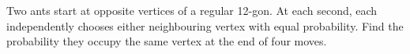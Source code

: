 Two ants start at opposite vertices of a regular 12-gon. At each second, each independently chooses either neighbouring vertex with equal probability. Find the probability they occupy the same vertex at the end of four moves.
